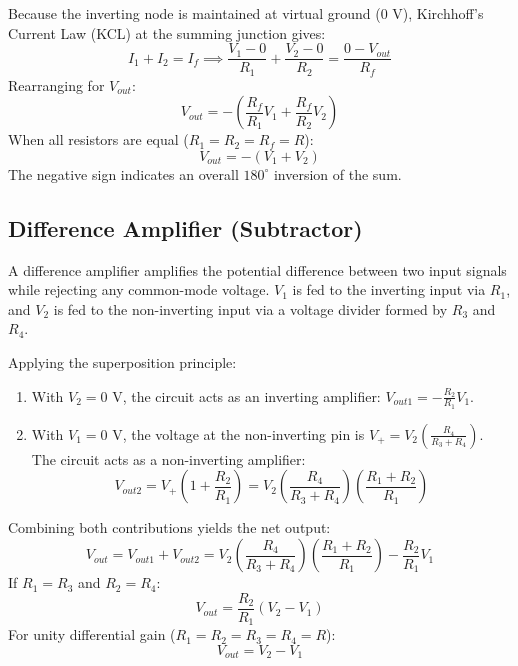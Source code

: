 Because the inverting node is maintained at virtual ground ($0\text{ V}$), Kirchhoff's Current Law (KCL) at the summing junction gives:
\begin{equation}
	I_1 + I_2 = I_f \implies \frac{V_1 - 0}{R_1} + \frac{V_2 - 0}{R_2} = \frac{0 - V_{out}}{R_f}
\end{equation}
Rearranging for $V_{out}$:
\begin{equation}
	V_{out} = - \left( \frac{R_f}{R_1} V_1 + \frac{R_f}{R_2} V_2 \right)
\end{equation}
When all resistors are equal ($R_1 = R_2 = R_f = R$):
\begin{equation}
	V_{out} = -(V_1 + V_2)
\end{equation}
The negative sign indicates an overall $180^\circ$ inversion of the sum.

\subsection{Difference Amplifier (Subtractor)}
A difference amplifier amplifies the potential difference between two input signals while rejecting any common-mode voltage. $V_1$ is fed to the inverting input via $R_1$, and $V_2$ is fed to the non-inverting input via a voltage divider formed by $R_3$ and $R_4$.

Applying the superposition principle:
\begin{enumerate}
	\item With $V_2 = 0\text{ V}$, the circuit acts as an inverting amplifier: $V_{out1} = -\frac{R_2}{R_1} V_1$.
	\item With $V_1 = 0\text{ V}$, the voltage at the non-inverting pin is $V_+ = V_2 \left(\frac{R_4}{R_3 + R_4}\right)$. The circuit acts as a non-inverting amplifier:
	\begin{equation}
		V_{out2} = V_+ \left( 1 + \frac{R_2}{R_1} \right) = V_2 \left( \frac{R_4}{R_3 + R_4} \right) \left( \frac{R_1 + R_2}{R_1} \right)
	\end{equation}
\end{enumerate}
Combining both contributions yields the net output:
\begin{equation}
	V_{out} = V_{out1} + V_{out2} = V_2 \left( \frac{R_4}{R_3 + R_4} \right) \left( \frac{R_1 + R_2}{R_1} \right) - \frac{R_2}{R_1} V_1
\end{equation}
If $R_1 = R_3$ and $R_2 = R_4$:
\begin{equation}
	V_{out} = \frac{R_2}{R_1} (V_2 - V_1)
\end{equation}
For unity differential gain ($R_1 = R_2 = R_3 = R_4 = R$):
\begin{equation}
	V_{out} = V_2 - V_1
\end{equation}

